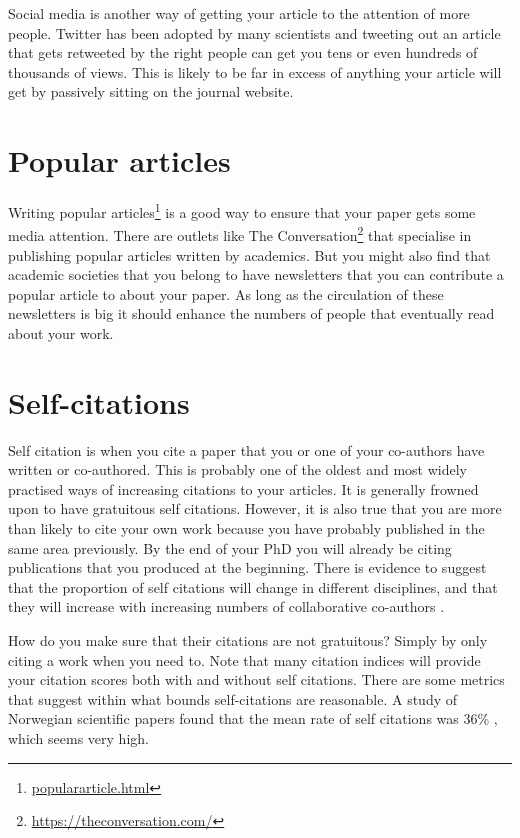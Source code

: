 \documentclass[
]{krantz}
\renewcommand{\href}[2]{#2\footnote{\url{#1}}}
\begin{document}
Social media is another way of getting your article to the attention of more people. Twitter has been adopted by many scientists and tweeting out an article that gets retweeted by the right people can get you tens or even hundreds of thousands of views. This is likely to be far in excess of anything your article will get by passively sitting on the journal website.

\hypertarget{popular-articles}{%
\section{Popular articles}\label{popular-articles}}

\href{populararticle.html}{Writing popular articles} is a good way to ensure that your paper gets some media attention. There are outlets like \href{https://theconversation.com/}{The Conversation} that specialise in publishing popular articles written by academics. But you might also find that academic societies that you belong to have newsletters that you can contribute a popular article to about your paper. As long as the circulation of these newsletters is big it should enhance the numbers of people that eventually read about your work.

\hypertarget{self-citations}{%
\section{Self-citations}\label{self-citations}}

Self citation is when you cite a paper that you or one of your co-authors have written or co-authored. This is probably one of the oldest and most widely practised ways of increasing citations to your articles. It is generally frowned upon to have gratuitous self citations. However, it is also true that you are more than likely to cite your own work because you have probably published in the same area previously. By the end of your PhD you will already be citing publications that you produced at the beginning. There is evidence to suggest that the proportion of self citations will change in different disciplines, and that they will increase with increasing numbers of collaborative co-authors \citep{davarpanah2009author}.

How do you make sure that their citations are not gratuitous? Simply by only citing a work when you need to. Note that many citation indices will provide your citation scores both with and without self citations. There are some metrics that suggest within what bounds self-citations are reasonable. A study of Norwegian scientific papers found that the mean rate of self citations was 36\% \citep{aksnes2003macro}, which seems very high.
\end{document}
